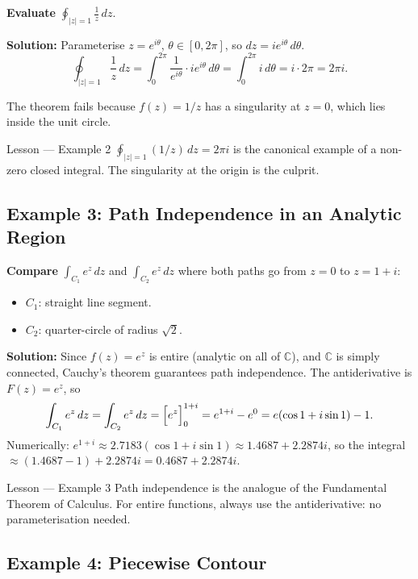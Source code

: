 \documentclass[12pt,a4paper]{article}
\begin{document}
\textbf{Evaluate} $\displaystyle\oint_{|z|=1} \frac{1}{z}\,dz$.

\textbf{Solution:}
Parameterise $z = e^{i\theta}$, $\theta \in [0, 2\pi]$, so $dz = ie^{i\theta}\,d\theta$.
\[
  \oint_{|z|=1} \frac{1}{z}\,dz
  = \int_{0}^{2\pi} \frac{1}{e^{i\theta}} \cdot ie^{i\theta}\,d\theta
  = \int_{0}^{2\pi} i\,d\theta
  = i \cdot 2\pi
  = 2\pi i.
\]

The theorem fails because $f(z)=1/z$ has a singularity at $z=0$, which lies inside the unit circle.

\begin{learnbox}{Lesson --- Example 2}
$\oint_{|z|=1}(1/z)\,dz = 2\pi i$ is the canonical example of a non-zero closed integral.
The singularity at the origin is the culprit.
\end{learnbox}

\subsection*{Example 3: Path Independence in an Analytic Region}

\textbf{Compare} $\displaystyle\int_{C_1} e^z\,dz$ and $\displaystyle\int_{C_2} e^z\,dz$
where both paths go from $z=0$ to $z=1+i$:
\begin{itemize}
  \item $C_1$: straight line segment.
  \item $C_2$: quarter-circle of radius $\sqrt{2}$.
\end{itemize}

\textbf{Solution:}
Since $f(z)=e^z$ is entire (analytic on all of $\mathbb{C}$), and $\mathbb{C}$ is simply connected,
Cauchy's theorem guarantees path independence.
The antiderivative is $F(z) = e^z$, so
\[
  \int_{C_1} e^z\,dz
  = \int_{C_2} e^z\,dz
  = \Bigl[e^z\Bigr]_{0}^{1+i}
  = e^{1+i} - e^{0}
  = e(\cos 1 + i\sin 1) - 1.
\]
Numerically: $e^{1+i} \approx 2.7183(\cos 1 + i\sin 1) \approx 1.4687 + 2.2874i$,
so the integral $\approx (1.4687 - 1) + 2.2874i = 0.4687 + 2.2874i$.

\begin{learnbox}{Lesson --- Example 3}
Path independence is the analogue of the Fundamental Theorem of Calculus.
For entire functions, always use the antiderivative: no parameterisation needed.
\end{learnbox}

\subsection*{Example 4: Piecewise Contour}
\end{document}
